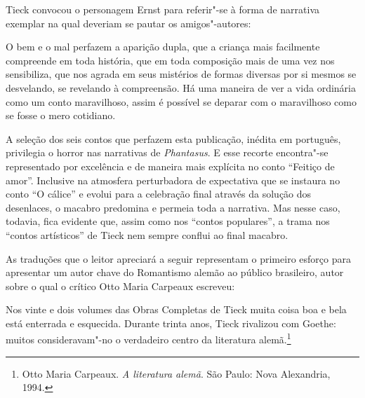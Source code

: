 Tieck convocou o personagem Ernst para referir"-se à forma de narrativa
exemplar na qual deveriam se pautar os amigos"-autores: 

\begin{hedraquote}
O bem e o mal perfazem a aparição dupla, que a criança mais facilmente
compreende em toda história, que em toda composição mais de uma vez nos
sensibiliza, que nos agrada em seus mistérios de formas diversas por si
mesmos se desvelando, se revelando à compreensão. Há uma maneira de ver
a vida \mbox{ordinária} como um conto maravilhoso, assim é possível se deparar
com o maravilhoso como se fosse o mero cotidiano.
\end{hedraquote}

A seleção dos seis contos que perfazem esta publicação, inédita em português,
privilegia o horror nas narrativas de 
\textit{Phantasus}. E esse recorte encontra"-se
representado por excelência e de maneira mais explícita no conto
``Feitiço de amor''. Inclusive na atmosfera perturbadora de expectativa que
se instaura no conto ``O cálice'' e evolui para a celebração final		
através da solução dos desenlaces, o macabro predomina e permeia toda a
narrativa. Mas nesse caso, todavia, fica evidente que, assim como nos
``contos populares'', a trama nos ``contos artísticos'' de Tieck nem sempre
conflui ao final macabro. 

As traduções que o leitor apreciará a seguir representam o primeiro esforço para 
apresentar um autor chave do Romantismo alemão ao público brasileiro, 
autor sobre o qual o crítico Otto Maria Carpeaux escreveu: 

\begin{hedraquote}
Nos vinte e dois volumes das Obras Completas de Tieck 
muita coisa boa e bela está enterrada e esquecida. Durante trinta anos, 
Tieck rivalizou com Goethe: muitos consideravam"-no o verdadeiro centro da
literatura alemã.\footnote{ Otto Maria Carpeaux. \textit{A literatura alemã}. 
São Paulo: Nova Alexandria, 1994.}
\end{hedraquote}

